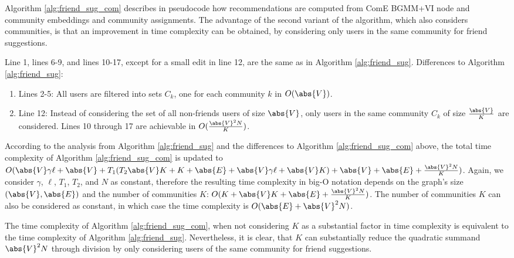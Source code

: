 \documentclass[conference]{IEEEtran}
\begin{document}
Algorithm \ref{alg:friend_sug_com} describes in pseudocode how recommendations are computed from ComE BGMM+VI node and community embeddings and community assignments. The advantage of the second variant of the algorithm, which also considers communities, is that an improvement in time complexity can be obtained, by considering only users in the same community for friend suggestions.

Line 1, lines 6-9, and lines 10-17, except for a small edit in line 12, are the same as in Algorithm \ref{alg:friend_sug}. Differences to Algorithm \ref{alg:friend_sug}:

\begin{enumerate}
    \item Lines 2-5: All users are filtered into sets $C_k$, one for each community $k$ in $O(\abs{V})$.
    \item Line 12: Instead of considering the set of all non-friends users of size $\abs{V}$, only users in the same community $C_k$ of size $\frac{\abs{V}}{K}$ are considered. Lines 10 through 17 are achievable in $O(\frac{\abs{V}^2N}{K})$.
\end{enumerate}

According to the analysis from Algorithm \ref{alg:friend_sug} and the differences to Algorithm \ref{alg:friend_sug_com} above, the total time complexity of Algorithm \ref{alg:friend_sug_com} is updated to $O(\abs{V}\gamma\ell + \abs{V} + T_1 (T_2\abs{V}K + K + \abs{E} + \abs{V}\gamma\ell + \abs{V}K) + \abs{V} + \abs{E} + \frac{\abs{V}^2N}{K})$. Again, we consider $\gamma$, $\ell$, $T_1$, $T_2$, and $N$ as constant, therefore the resulting time complexity in big-O notation depends on the graph's size $(\abs{V}, \abs{E})$ and the number of communities $K$: $O(K + \abs{V}K + \abs{E} + \frac{\abs{V}^2N}{K})$. The number of communities $K$ can also be considered as constant, in which case the time complexity is $O(\abs{E} + \abs{V}^2N)$.

The time complexity of Algorithm \ref{alg:friend_sug_com}, when not considering $K$ as a substantial factor in time complexity is equivalent to the time complexity of Algorithm \ref{alg:friend_sug}. Nevertheless, it is clear, that $K$ can substantially reduce the quadratic summand $\abs{V}^2N$ through division by only considering users of the same community for friend suggestions.








\printbibliography
\end{document}
